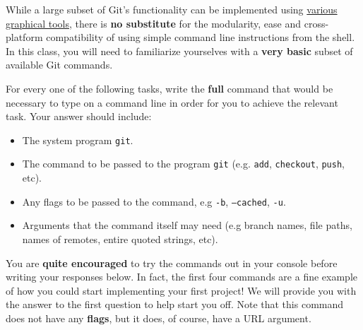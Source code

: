 \documentclass[letterpaper,12pt]{article}
\begin{document}
While a large subset of Git's functionality can be implemented using \href{https://git-scm.com/download/gui/linux}{various graphical tools}, there is {\bf no substitute} for the modularity, ease and cross-platform compatibility of using simple command line instructions from the shell. In this class, you will need to familiarize yourselves with a {\bf very basic} subset of available Git commands.

For every one of the following tasks, write the {\bf full} command that would be necessary to type on a command line in order for you to achieve the relevant task. Your answer should include: 
	\begin{itemize} \setlength{\itemsep}{.5em}
		\item The system program {\tt git}.
		\item The command to be passed to the program {\tt git} (e.g. {\tt add}, {\tt checkout}, {\tt push}, etc).
		\item Any flags to be passed to the command, e.g {\tt -b}, {\tt --cached}, {\tt -u}.
		\item Arguments that the command itself may need (e.g branch names, file paths, names of remotes, entire quoted strings, etc).
	\end{itemize}
	
You are {\bf quite encouraged} to try the commands out in your console before writing your responses below. In fact, the first four commands are a fine example of how you could start implementing your first project! We will provide you with the answer to the first question to help start you off. Note that this command does not have any \textbf{flags}, but it does, of course, have a URL argument.
\end{document}
